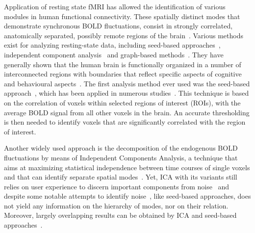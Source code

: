 \bigbreak

Application of resting state fMRI has allowed the identification of various modules in human functional connectivity.
These spatially distinct modes that demonstrate synchronous BOLD fluctuations, consist in strongly correlated, anatomically separated, possibly remote regions of the brain~\cite{biswal1995,raichle2001,fox2005,biswal2012}.
Various methods exist for analyzing resting-state data, including seed-based approaches~\cite{biswal1995,raichle2001}, independent component analysis~\cite{beckmann2005,damoiseaux2006} and graph-based methods~\cite{stam2007,bullmore2009}. They have generally shown that the human brain is functionally organized in a number of interconnected regions with boundaries that reflect specific aspects of cognitive and behavioural aspects~\cite{tomasi2012,alnaes2015,crossley2013a}.
The first analysis method ever used was the seed-based approach~\cite{biswal1995}, which has been applied in numerous studies~\cite{raichle2001}.
This technique is based on the correlation of voxels within selected regions of interest (ROIs), with the average BOLD signal from all other voxels in the brain.
An accurate thresholding is then needed to identify voxels that are significantly correlated with the region of interest.

Another widely used approach is the decomposition of the endogenous BOLD fluctuations by means of Independent Components Analysis, a technique that aims at maximizing statistical independence between time courses of single voxels and that can identify separate spatial modes~\cite{damoiseaux2006,beckmann2005,calhoun2013}.
Yet, ICA with its variants still relies on user experience to discern important components from noise~\cite{lee2013} and despite some notable attempts to identify noise~\cite{thomas2002,tohka2008}, like seed-based approaches, does not yield any information on the hierarchy of modes, nor on their relation.
Moreover, largely overlapping results can be obtained by ICA and seed-based approaches~\cite{rosazza2012}.

